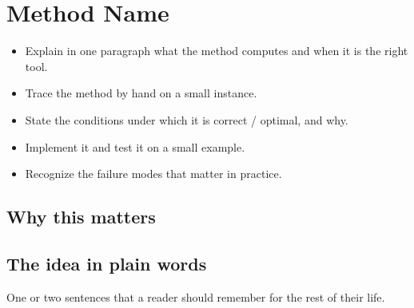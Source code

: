 \chapter{Method Name}
\label{ch:chNN}

\begin{objectives}
\begin{itemize}
  \item Explain in one paragraph what the method computes and when it is the right tool.
  \item Trace the method by hand on a small instance.
  \item State the conditions under which it is correct / optimal, and why.
  \item Implement it and test it on a small example.
  \item Recognize the failure modes that matter in practice.
\end{itemize}
\end{objectives}

\section{Why this matters}
\label{sec:chNN-motivation}

\section{The idea in plain words}
\label{sec:chNN-intuition}
\begin{keyidea}
One or two sentences that a reader should remember for the rest of their life.
\end{keyidea}

